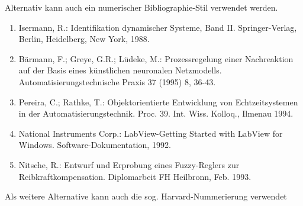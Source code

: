 Alternativ kann auch ein numerischer Bibliographie-Stil verwendet werden.
\renewcommand{\labelenumi}{[\theenumi]}
\begin{enumerate}
  \item Isermann, R.: Identifikation dynamischer Systeme, Band II. Springer-Verlag, Berlin, Heidelberg, New York, 1988.
  \item Bärmann, F.;  Greye, G.R.; Lüdeke, M.: Prozessregelung einer Nachreaktion auf der Basis eines künstlichen neuronalen Netzmodells. Automatisierungstechnische Praxis 37 (1995) 8, 36-43.
  \item Pereira, C.;  Rathke, T.: Objektorientierte Entwicklung von Echtzeitsystemen in der Automatisierungstechnik. Proc. 39. Int. Wiss. Kolloq., Ilmenau 1994.
  \item  National Instruments Corp.: LabView-Getting Started with LabView for Windows. Software-Dokumentation, 1992.
  \item Nitsche, R.: Entwurf und Erprobung eines Fuzzy-Reglers zur Reibkraftkompensation. Diplomarbeit FH Heilbronn, Feb. 1993.
\end{enumerate}
\renewcommand{\labelenumi}{\theenumi.}
Als weitere Alternative kann auch die sog. Harvard-Nummerierung  verwendet
